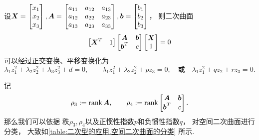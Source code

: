 \begin{theorem}[空间二次曲面的分类定理]
设\(\boldsymbol{X} = \begin{bmatrix}
	x_1 \\ x_2 \\ x_3
\end{bmatrix},
\boldsymbol{A} = \begin{bmatrix}
	a_{11} & a_{12} & a_{13} \\
	a_{12} & a_{22} & a_{23} \\
	a_{13} & a_{23} & a_{33}
\end{bmatrix},
\boldsymbol{b} = \begin{bmatrix}
	b_1 \\ b_2 \\ b_3
\end{bmatrix}\)，
则二次曲面\[
	\begin{bmatrix}
		\boldsymbol{X}^T & 1
	\end{bmatrix}
	\begin{bmatrix}
		\boldsymbol{A} & \boldsymbol{b} \\
		\boldsymbol{b}^T & c
	\end{bmatrix}
	\begin{bmatrix}
		\boldsymbol{X} \\ 1
	\end{bmatrix}
	= 0
\]可以经过正交变换、平移变换化为\[
	\lambda_1 z_1^2 + \lambda_2 z_2^2 + \lambda_3 z_3^2 + d = 0,
	\qquad
	\lambda_1 z_1^2 + \lambda_2 z_2^2 + p z_3 = 0,
	\quad\text{或}\quad
	\lambda_1 z_1^2 + q z_2 + r z_3 = 0.
\]
\end{theorem}

记\begin{equation*}
	\rho_3 := \rank\boldsymbol{A},
	\qquad
	\rho_4 := \rank\begin{bmatrix}
		\boldsymbol{A} & \boldsymbol{b} \\
		\boldsymbol{b}^T & c
	\end{bmatrix}.
\end{equation*}
那么我们可以依据
秩\(\rho_3,\rho_4\)以及正惯性指数\(p\)和负惯性指数\(q\)，
对空间二次曲面进行分类，
大致如\cref{table:二次型的应用.空间二次曲面的分类} 所示.

